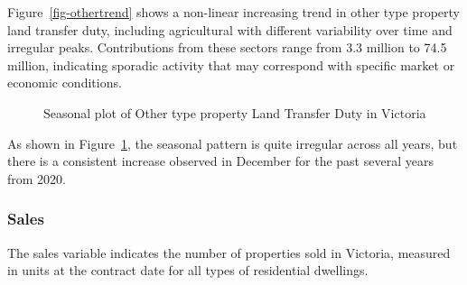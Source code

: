 \documentclass[
  11pt,
  a4paper,
]{article}
\begin{document}
Figure~\ref{fig-othertrend} shows a non-linear increasing trend in other
type property land transfer duty, including agricultural with different
variability over time and irregular peaks. Contributions from these
sectors range from 3.3 million to 74.5 million, indicating sporadic
activity that may correspond with specific market or economic
conditions.

\begin{figure}


\caption{\label{fig-otherspattern}Seasonal plot of Other type property
Land Transfer Duty in Victoria}

\end{figure}%

As shown in Figure~\ref{fig-otherspattern}, the seasonal pattern is
quite irregular across all years, but there is a consistent increase
observed in December for the past several years from 2020.

\subsubsection{Sales}\label{sales}

The sales variable indicates the number of properties sold in Victoria,
measured in units at the contract date for all types of residential
dwellings.
\end{document}
